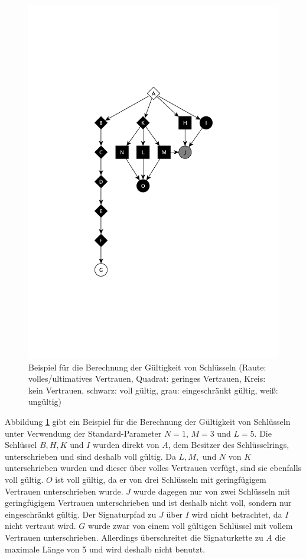 \begin{figure}[ht!]
  \centering
  \includegraphics[scale=0.7]{images/trust-beispiel.pdf}
  \caption{Beispiel für die Berechnung der Gültigkeit von Schlüsseln
    (Raute: volles/ultimatives Vertrauen, Quadrat: geringes Vertrauen,
    Kreis: kein Vertrauen, schwarz: voll g\"ultig, grau:
    eingeschr\"ankt g\"ultig, wei{\ss}: ung\"ultig)}
  \label{fig:trust-beispiel}
\end{figure}

Abbildung \ref{fig:trust-beispiel} gibt ein Beispiel für die
Berechnung der Gültigkeit von Schlüsseln unter Verwendung der
Standard-Parameter $N=1$, $M=3$ und $L=5$. Die Schlüssel $B, H, K$ und
$I$ wurden direkt von $A$, dem Besitzer des Schlüsselrings,
unterschrieben und sind deshalb voll gültig. Da $L, M,$ und $N$ von
$K$ unterschrieben wurden und dieser über volles Vertrauen verfügt,
sind sie ebenfalls voll gültig. $O$ ist voll gültig, da er
von drei Schlüsseln mit  geringf\"ugigem Vertrauen unterschrieben
wurde. $J$ wurde dagegen nur von zwei Schlüsseln mit
geringfügigem Vertrauen unterschrieben und ist deshalb nicht voll, 
sondern nur eingeschränkt gültig. Der Signaturpfad zu $J$ \"uber $I$
wird nicht betrachtet, da $I$ nicht vertraut wird. $G$ wurde zwar von einem voll
gültigen Schlüssel mit vollem Vertrauen unterschrieben. Allerdings
überschreitet die Signaturkette zu $A$ die maximale Länge von 5 und
wird deshalb nicht benutzt.

